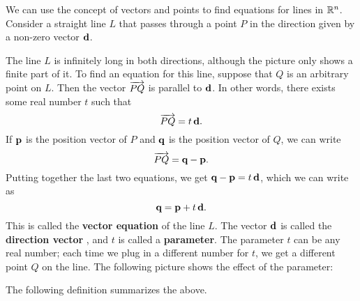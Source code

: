 We can use the concept of vectors and points to find equations for
lines in $\mathbb{R}^n$. Consider a straight line $L$ that passes through a
point $P$ in the direction given by a non-zero vector $\mbox{\bf d}$.
\begin{center}
\end{center}
The line $L$ is infinitely long in both directions, although the
picture only shows a finite part of it. To find an equation for this
line, suppose that $Q$ is an arbitrary point on $L$. Then the vector
$\overrightarrow{PQ}$ is parallel to $\mbox{\bf d}$. In other words, there
exists some real number $t$ such that
\begin{equation*}
  \overrightarrow{PQ} = t\,\mbox{\bf d}.
\end{equation*}
If $\mbox{\bf p}$ is the position vector of $P$ and $\mbox{\bf q}$ is the
position vector of $Q$, we can write
\begin{equation*}
  \overrightarrow{PQ} = \mbox{\bf q}-\mbox{\bf p}.
\end{equation*}
Putting together the last two equations, we get $\mbox{\bf q}-\mbox{\bf p} =
t\,\mbox{\bf d}$, which we can write as
\begin{equation*}
  \mbox{\bf q} = \mbox{\bf p} + t\,\mbox{\bf d}.
\end{equation*}
This is called the \textbf{vector equation}%
 of the
line $L$. The vector $\mbox{\bf d}$ is called the \textbf{direction
  vector}%
, and $t$ is
called a \textbf{parameter}. The parameter $t$ can be
any real number; each time we plug in a different number for $t$, we
get a different point $Q$ on the line. The following picture shows the
effect of the parameter:
\begin{center}
\end{center}
The following definition summarizes the above.

